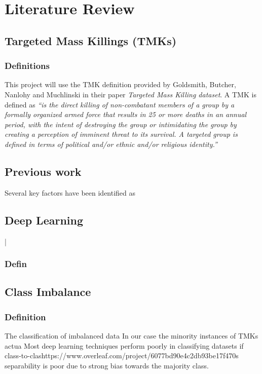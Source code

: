 \chapter{Literature Review}\label{ch:background}

\section{Targeted Mass Killings (TMKs)}
\subsection{Definitions}
This project will use the TMK definition provided by Goldsmith, Butcher, Nanlohy and Muchlinski in their paper \emph{Targeted Mass Killing dataset}. A TMK is defined as \emph{“is the direct killing of non-combatant members of a
group by a formally organized armed force that results in 25 or more deaths in an annual period,
with the intent of destroying the group or intimidating the group by creating a perception of
imminent threat to its survival. A targeted group is defined in terms of political and/or ethnic and/or
religious identity.”}

\section{Previous work}
Several key factors have been identified as 


\section{Deep Learning}|
\subsection{Defin}

\section{Class Imbalance}
\subsection{Definition}
The classification of imbalanced data
In our case the minority instances of TMKs actua
Most deep learning techniques perform poorly in classifying datasets if class-to-clashttps://www.overleaf.com/project/6077bd90e4c2db93be17f470s separability is poor due to strong bias towards the majority class.


